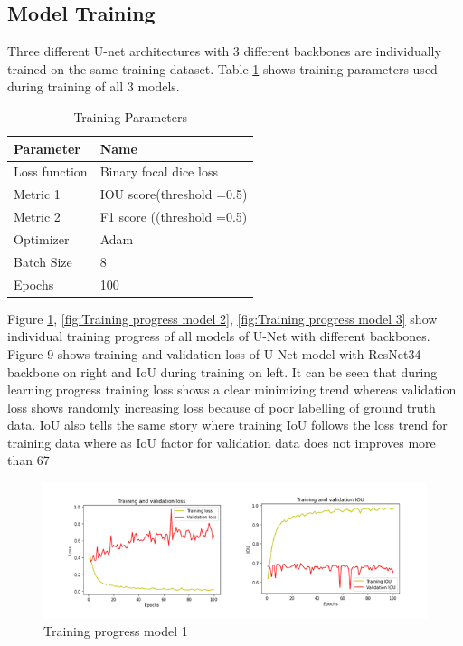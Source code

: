 \documentclass[rnd]{mas_proposal}
\begin{document}
\subsection{Model Training}

Three different U-net architectures with 3 different backbones are individually trained on the same training dataset.  
Table \ref{tab:Training} shows training parameters used during training of  all 3 models.

\begin{table}[h]
        \centering
        \begin{tabular}{|l|l|}
        \hline
        \textbf{Parameter} & \textbf{Name}              \\ \hline
        Loss function      & Binary focal dice loss     \\ \hline
        Metric 1           & IOU score(threshold =0.5)  \\ \hline
        Metric 2           & F1 score ((threshold =0.5) \\ \hline
        Optimizer          & Adam                       \\ \hline
        Batch Size         & 8                          \\ \hline
        Epochs             & 100                        \\ \hline
        \end{tabular}
        \caption{Training Parameters}
        \label{tab:Training}
        \end{table}



Figure \ref{fig:Training progress model 1}, \ref{fig:Training progress model 2}, \ref{fig:Training progress model 3} show individual training progress of all models of U-Net with different backbones. Figure-9 shows training and validation loss of U-Net model
with ResNet34 backbone on right and IoU during training on left. It can be seen that during learning progress training loss shows a clear minimizing trend 
whereas validation loss shows randomly increasing loss because of poor labelling of ground truth data. IoU also tells the same story where training IoU
follows the loss trend for training data where as IoU factor for validation data does not improves more than 67%

\begin{figure}[htp] 
        \centering
        \includegraphics[width=1.2\textwidth]{images/fig9.png}
        \caption{Training progress model 1}%
        \label{fig:Training progress model 1}%
\end{figure}
\end{document}
